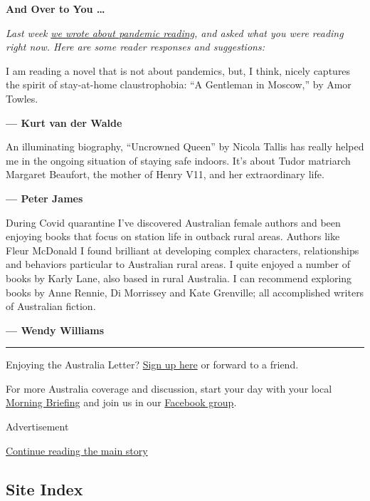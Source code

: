 \textbf{And Over to You \ldots{}}

\emph{Last week}
\href{https://www.nytimes3xbfgragh.onion/2020/07/24/world/australia/divisions-decency-and-the-plague.html}{\emph{we
wrote about pandemic reading}}\emph{, and asked what you were reading
right now. Here are some reader responses and suggestions:}

I am reading a novel that is not about pandemics, but, I think, nicely
captures the spirit of stay-at-home claustrophobia: ``A Gentleman in
Moscow,'' by Amor Towles.

\textbf{--- Kurt van der Walde}

An illuminating biography, ``Uncrowned Queen'' by Nicola Tallis has
really helped me in the ongoing situation of staying safe indoors. It's
about Tudor matriarch Margaret Beaufort, the mother of Henry V11, and
her extraordinary life.

\textbf{--- Peter James}

During Covid quarantine I've discovered Australian female authors and
been enjoying books that focus on station life in outback rural areas.
Authors like Fleur McDonald I found brilliant at developing complex
characters, relationships and behaviors particular to Australian rural
areas. I quite enjoyed a number of books by Karly Lane, also based in
rural Australia. I can recommend exploring books by Anne Rennie, Di
Morrissey and Kate Grenville; all accomplished writers of Australian
fiction.

\textbf{--- Wendy Williams}

\begin{center}\rule{0.5\linewidth}{\linethickness}\end{center}

Enjoying the Australia Letter?
\href{https://www.nytimes3xbfgragh.onion/newsletters/australia-letter?module=inline}{Sign
up here} or forward to a friend.

For more Australia coverage and discussion, start your day with your
local
\href{https://www.nytimes3xbfgragh.onion/interactive/2018/briefing/global-morning-briefing-newsletter-signup.html?utm_source=ausend}{Morning
Briefing} and join us in our
\href{https://www.facebookcorewwwi.onion/groups/nytaustralia/}{Facebook
group}.

Advertisement

\protect\hyperlink{after-bottom}{Continue reading the main story}

\hypertarget{site-index}{%
\subsection{Site Index}\label{site-index}}

